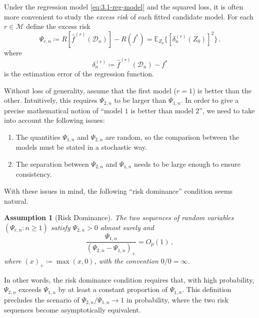 \documentclass[11pt]{article}
\theoremstyle{plain}
\newtheorem{assumption}[theorem]{Assumption}
\newcommand{\D}{{\mathcal{D}}}
\begin{document}
Under the regression model \eqref{eq:3.1-reg-model} and the squared loss, it is often more convenient to study the \emph{excess risk} of each fitted candidate model. For each $r\in\mathcal M$ define the excess risk
\begin{equation}
    \label{eq:3.1-excess-risk}
    \Psi_{r,n}\coloneqq R[\hat f^{(r)}(\D_n)] - R(f^*)=\mathbb E_{Z_0} \{[\delta_n^{(r)}(Z_0)]^2\}\,.
\end{equation}
where
$$
\delta^{(r)}_n\coloneqq \hat f^{(r)}(\D_n)-f^*
$$
is the estimation error of the regression function.

Without loss of generality, assume that the first model ($r=1$) is better than the other. Intuitively, this requires $\Psi_{2,n}$ to be larger than $\Psi_{1,n}$. In order to give a precise mathematical notion of ``model $1$ is better than model $2$'', we need to take into account the following issues:
\begin{enumerate}
    \item [(i)] The quantities $\Psi_{1,n}$ and $\Psi_{2,n}$ are random, so the comparison between the models must be stated in a stochastic way.
    \item [(ii)] The separation between $\Psi_{2,n}$ and $\Psi_{1,n}$ needs to be large enough to ensure consistency.
\end{enumerate}
With these issues in mind, the following ``risk dominance'' condition seems natural.
\begin{assumption}[Risk Dominance]\label{asm:3.1-stochastic_domination}
The two sequences of random variables $(\Psi_{r,n}:n\ge 1)$ satisfy $\Psi_{2,n}>0$ almost surely and
  \begin{equation}\label{eq:3.1-risk-dom}\frac{\Psi_{1,n}}{(\Psi_{2,n}-\Psi_{1,n})_+}=O_p(1)\,,\end{equation}
  where $(x)_+\coloneqq \max(x,0)$, with the convention $0/0=\infty$.
\end{assumption}
In other words, the risk dominance condition requires that, with high probability, $\Psi_{2,n}$ exceeds $\Psi_{1,n}$ by at least a constant proportion of $\Psi_{1,n}$.  This definition precludes the scenario of $\Psi_{2,n}/\Psi_{1,n}\rightarrow 1$ in probability, where the two risk sequences become asymptotically equivalent.
\end{document}
